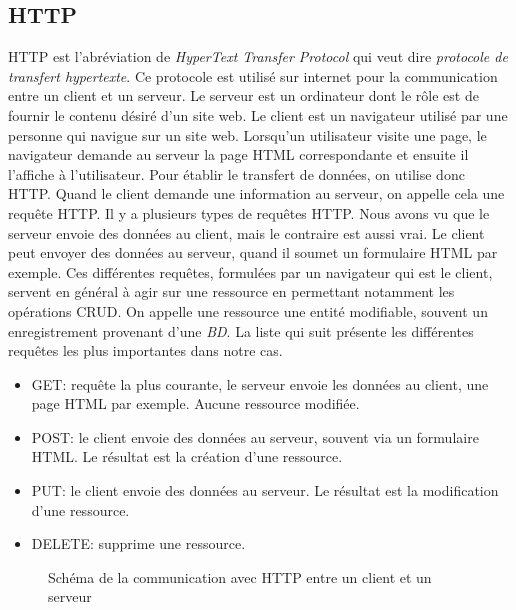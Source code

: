 \documentclass[a4paper,10pt,twoside]{sphinxmanual}
\begin{document}
\subsection{HTTP}
\label{restless:http}
HTTP est l'abréviation de \emph{HyperText Transfer Protocol} qui veut dire \emph{protocole de transfert hypertexte}. Ce protocole est utilisé sur internet pour la communication entre un client et un serveur. Le serveur est un ordinateur dont le rôle est de fournir le contenu désiré d'un site web. Le client est un navigateur utilisé par une personne qui navigue sur un site web. Lorsqu'un utilisateur visite une page, le navigateur demande au serveur la page HTML correspondante et ensuite il l'affiche à l'utilisateur. Pour établir le transfert de données, on utilise donc HTTP. Quand le client demande une information au serveur, on appelle cela une requête HTTP. Il y a plusieurs types de requêtes HTTP. Nous avons vu que le serveur envoie des données au client, mais le contraire est aussi vrai. Le client peut envoyer des données au serveur, quand il soumet un formulaire HTML par exemple. Ces différentes requêtes, formulées par un navigateur qui est le client, servent en général à agir sur une ressource en permettant notamment les opérations CRUD. On appelle une ressource une entité modifiable, souvent un enregistrement provenant d'une \emph{BD}. La liste qui suit présente les différentes requêtes les plus importantes dans notre cas.
\begin{itemize}
\item {} 
GET: requête la plus courante, le serveur envoie les données au client, une page HTML par exemple. Aucune ressource modifiée.

\item {} 
POST: le client envoie des données au serveur, souvent via un formulaire HTML. Le résultat est la création d'une ressource.

\item {} 
PUT: le client envoie des données au serveur. Le résultat est la modification d'une ressource.

\item {} 
DELETE: supprime une ressource.

\end{itemize}
\begin{figure}[htbp]
\centering
\capstart

\caption{Schéma de la communication avec HTTP entre un client et un serveur}\end{figure}
\end{document}
